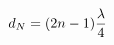 \documentclass[preview]{standalone}
\begin{document}
\begin{align*}
\special{dvisvgm:raw <g id='unique000'>}d_N = (2n-1)\frac{\lambda}{4}\special{dvisvgm:raw </g>}
\end{align*}
\end{document}
